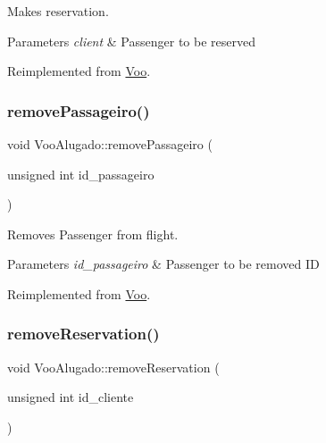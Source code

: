 Makes reservation. 


\begin{DoxyParams}{Parameters}
{\em client} & Passenger to be reserved \\
\hline
\end{DoxyParams}


Reimplemented from \hyperlink{class_voo_aa308fcf651fdf54b0a03e881c6d8fea4}{Voo}.

\mbox{\label{class_voo_alugado_aaf46e034bb4655c62b432f9669a7ed65}} 
\subsubsection{\texorpdfstring{remove\+Passageiro()}{removePassageiro()}}
{\footnotesize\ttfamily void Voo\+Alugado\+::remove\+Passageiro (\begin{DoxyParamCaption}\item[{unsigned int}]{id\+\_\+passageiro }\end{DoxyParamCaption})\hspace{0.3cm}{\ttfamily [virtual]}}



Removes Passenger from flight. 


\begin{DoxyParams}{Parameters}
{\em id\+\_\+passageiro} & Passenger to be removed ID \\
\hline
\end{DoxyParams}


Reimplemented from \hyperlink{class_voo_ad0c67dc3c01f30746e150f26d5bf15ac}{Voo}.

\mbox{\label{class_voo_alugado_afcd0ae78d182121fe1a6c010dbeca60d}} 
\subsubsection{\texorpdfstring{remove\+Reservation()}{removeReservation()}}
{\footnotesize\ttfamily void Voo\+Alugado\+::remove\+Reservation (\begin{DoxyParamCaption}\item[{unsigned int}]{id\+\_\+cliente }\end{DoxyParamCaption})\hspace{0.3cm}{\ttfamily [virtual]}}



